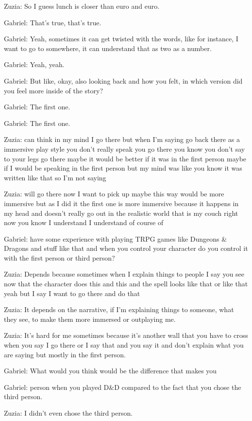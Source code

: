 Zuzia: So I guess lunch is closer than euro and euro.

Gabriel: That's true, that's true.

Gabriel: Yeah, sometimes it can get twisted with the words, like for instance, I want to go to somewhere, it can understand that as two as a number.

Gabriel: Yeah, yeah.

Gabriel: But like, okay, also looking back and how you felt, in which version did you feel more inside of the story?

Gabriel: The first one.

Gabriel: The first one.

Zuzia: can think in my mind I go there but when I'm saying go back there as a immersive play style you don't really speak you go there you know you don't say to your legs go there maybe it would be better if it was in the first person maybe if I would be speaking in the first person but my mind was like you know it was written like that so I'm not saying

Zuzia: will go there now I want to pick up maybe this way would be more immersive but as I did it the first one is more immersive because it happens in my head and doesn't really go out in the realistic world that is my couch right now you know I understand I understand of course of

Gabriel: have some experience with playing TRPG games like Dungeons & Dragons and stuff like that and when you control your character do you control it with the first person or third person?

Zuzia: Depends because sometimes when I explain things to people I say you see now that the character does this and this and the spell looks like that or like that yeah but I say I want to go there and do that

Zuzia: It depends on the narrative, if I'm explaining things to someone, what they see, to make them more immersed or outplaying me.

Zuzia: It's hard for me sometimes because it's another wall that you have to cross when you say I go there or I say that and you say it and don't explain what you are saying but mostly in the first person.

Gabriel: What would you think would be the difference that makes you

Gabriel: person when you played D&D compared to the fact that you chose the third person.

Zuzia: I didn't even chose the third person.

